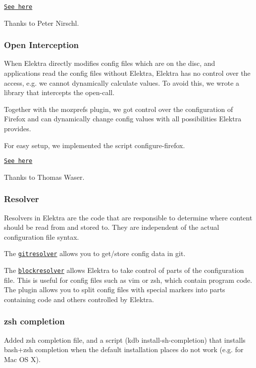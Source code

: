 \href{http://git.libelektra.org/tree/master/src/plugins/crypto}{\tt See here}

Thanks to Peter Nirschl.

\subsubsection*{Open Interception}

When Elektra directly modifies config files which are on the disc, and applications read the config files without Elektra, Elektra has no control over the access, e.\+g. we cannot dynamically calculate values. To avoid this, we wrote a library that intercepts the {\ttfamily open}-\/call.

Together with the {\ttfamily mozprefs} plugin, we got control over the configuration of Firefox and can dynamically change config values with all possibilities Elektra provides.

For easy setup, we implemented the script {\ttfamily configure-\/firefox}.

\href{http://git.libelektra.org/tree/master/src/bindings/intercept}{\tt See here}

Thanks to Thomas Waser.

\subsubsection*{Resolver}

Resolvers in Elektra are the code that are responsible to determine where content should be read from and stored to. They are independent of the actual configuration file syntax.

The \href{http://git.libelektra.org/tree/master/src/plugins/gitresolver}{\tt gitresolver} allows you to get/store config data in git.

The \href{http://git.libelektra.org/tree/master/src/plugins/blockresolver}{\tt blockresolver} allows Elektra to take control of parts of the configuration file. This is useful for config files such as vim or zsh, which contain program code. The plugin allows you to split config files with special markers into parts containing code and others controlled by Elektra.

\subsubsection*{zsh completion}

Added zsh completion file, and a script ({\ttfamily kdb install-\/sh-\/completion}) that installs bash+zsh completion when the default installation places do not work (e.\+g. for Mac O\+S X).

